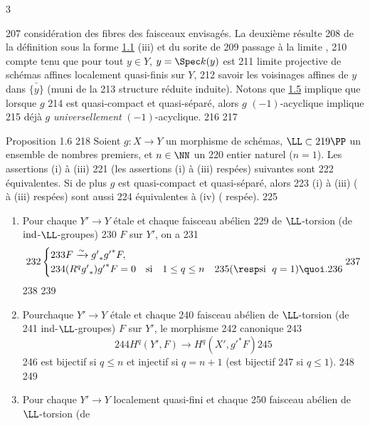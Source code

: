 3	\documentclass[10pt]{../fichiers-configuration-latex/smfart}
\begin{document}
   207	considération des fibres des faisceaux envisagés. La deuxième résulte
   208	de la définition sous la forme \hyperref[XV.prop1.1]{1.1} (iii) et du sorite de
   209	passage à la limite ,
   210	compte tenu que pour tout $y \in Y$, $y=\Spec k(y)$ est
   211	limite projective de schémas affines localement quasi-finis sur $Y$,
   212	savoir les voisinages affines de $y$ dans $\bar{\{y\}}$ (muni de la
   213	structure réduite induite). \sisi{}{--} Notons que \hyperref[XV.cor1.5]{1.5} implique que lorsque $g$
   214	est quasi-compact et quasi-séparé, alors $g$ $(-1)$-acyclique implique
   215	déjà $g$ \emph{universellement} $(-1)$-acyclique.
   216	
   217	\begin{enonce*}{Proposition 1.6}
   218	Soient $g:X\rightarrow Y$ un morphisme de schémas, $\LL\subset
   219	\PP$ un ensemble de nombres premiers, et $n \in \NN$ un
   220	entier naturel (\resp $n=1$). Les assertions {\rm (i)} à {\rm(iii)}
   221	(\resp les assertions {\rm(i)} à {\rm(iii)} respées) suivantes sont
   222	équivalentes. Si de plus $g$ est quasi-compact et quasi-séparé, alors
   223	{\rm(i)} à {\rm(iii)} ( à {\rm(iii)} respées) sont aussi
   224	équivalentes à {\rm(iv)} ( respée).
   225	\begin{enumerate}
   226	\renewcommand{\theenumi}{\roman{enumi}}
   227	\renewcommand{\labelenumi}{(\theenumi)}
   228	\item Pour chaque $Y'\rightarrow Y$ étale et chaque faisceau abélien
   229	  de $\LL$-torsion (\resp de $\text{\rm ind}$-$\LL$-groupes)
   230	  \emph{} $F$ sur $Y'$, on a
   231	$$
   232	\begin{cases}
   233	F\xrightarrow{\sim} {g'}_{\ast}{g'}^{\ast}F, &\\
   234	(R^{q}{g'}_{\ast}){g'}^{\ast}F=0 & \mbox{si}\quad 1\leq q\leq n\quad
   235	(\resp \mbox{si\; } q=1){\quoi}.
   236	\end{cases}
   237	$$
   238	
   239	\item Pour\pageoriginale chaque $Y'\rightarrow Y$ étale et chaque
   240	faisceau abélien de $\LL$-torsion (\resp de
   241	ind-$\LL$-groupes) $F$ sur $Y'$, le morphisme
   242	canonique
   243	$$
   244	H^{q}(Y',F)\longrightarrow H^{q}(X',{g'}^{\ast}F)
   245	$$
   246	est bijectif si $q\leq n$ et injectif si $q=n+1$ (\resp est bijectif
   247	si $q\leq 1$).
   248	
   249	\item Pour chaque $Y'\rightarrow Y$ localement quasi-fini et chaque
   250	faisceau abélien de $\LL$-torsion (\resp de

\end{enumerate}
\end{enonce*}
\end{document}
